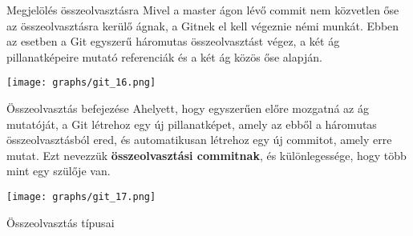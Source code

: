 \documentclass[english, aspectratio=169]{beamer}
\begin{document}
\begin{frame}{Megjelölés összeolvasztásra}
Mivel a master ágon lévő commit nem közvetlen őse az összeolvasztásra kerülő ágnak, a Gitnek el kell végeznie némi munkát. Ebben az esetben a Git egyszerű háromutas összeolvasztást végez, a két ág pillanatképeire mutató referenciák és a két ág közös őse alapján.
\begin{center}
\texttt{[image: graphs/git\_16.png]}
\end{center}
\end{frame}

\begin{frame}{Összeolvasztás befejezése}
Ahelyett, hogy egyszerűen előre mozgatná az ág mutatóját, a Git létrehoz egy új pillanatképet, amely az ebből a háromutas összeolvasztásból ered, és automatikusan létrehoz egy új commitot, amely erre mutat. Ezt nevezzük \textbf{összeolvasztási commitnak}, és különlegessége, hogy több mint egy szülője van.
\begin{center}
\texttt{[image: graphs/git\_17.png]}
\end{center}
\end{frame}

\begin{frame}{Összeolvasztás típusai}
\begin{columns}
\begin{column}{0.6\textwidth}
\begin{itemize}
\end{itemize}
\end{column}
\begin{column}{0.5\textwidth}
\begin{center}
\end{center}
\end{column}
\end{columns}
\end{frame}
\end{document}
